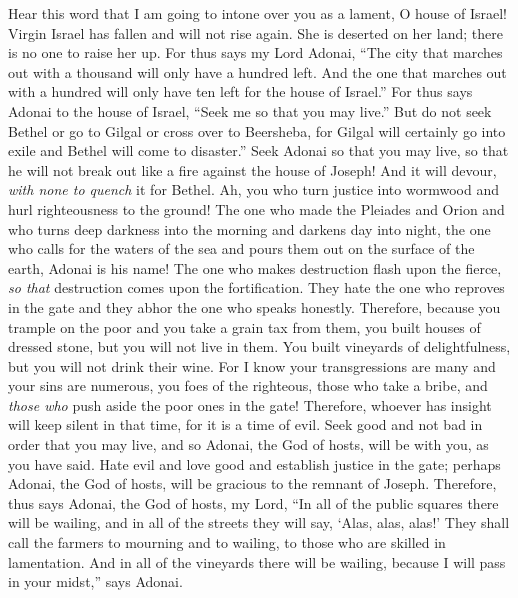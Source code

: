 \begin{biblechapter} %
 Hear this word that I am going to intone over you as a lament, O house of Israel!
\verse Virgin Israel has fallen and will not rise again. She is deserted on her land; there is no one to raise her up.
\verse For thus says my Lord Adonai, “The city that marches out with a thousand will only have a hundred left. And the one that marches out with a hundred will only have ten left for the house of Israel.”
\verse For thus says Adonai to the house of Israel, “Seek me so that you may live.”
\verse But do not seek Bethel or go to Gilgal or cross over to Beersheba, for Gilgal will certainly go into exile and Bethel will come to disaster.”
\verse Seek Adonai so that you may live, so that he will not break out like a fire against the house of Joseph! And it will devour, \textit{with none to quench} it for Bethel.
\verse Ah, you who turn justice into wormwood and hurl righteousness to the ground!
\verse The one who made the Pleiades and Orion and who turns deep darkness into the morning and darkens day into night, the one who calls for the waters of the sea and pours them out on the surface of the earth, Adonai is his name!
\verse The one who makes destruction flash upon the fierce, \textit{so that} destruction comes upon the fortification.
\verse They hate the one who reproves in the gate and they abhor the one who speaks honestly.
\verse Therefore, because you trample on the poor and you take a grain tax from them, you built houses of dressed stone, but you will not live in them. You built vineyards of delightfulness, but you will not drink their wine.
\verse For I know your transgressions are many and your sins are numerous, you foes of the righteous, those who take a bribe, and \textit{those who} push aside the poor ones in the gate!
\verse Therefore, whoever has insight will keep silent in that time, for it is a time of evil.
\verse Seek good and not bad in order that you may live, and so Adonai, the God of hosts, will be with you, as you have said.
\verse Hate evil and love good and establish justice in the gate; perhaps Adonai, the God of hosts, will be gracious to the remnant of Joseph.
\verse Therefore, thus says Adonai, the God of hosts, my Lord, “In all of the public squares there will be wailing, and in all of the streets they will say, ‘Alas, alas, alas!’ They shall call the farmers to mourning and to wailing, to those who are skilled in lamentation.
\verse And in all of the vineyards there will be wailing, because I will pass in your midst,” says Adonai.

\end{biblechapter}
